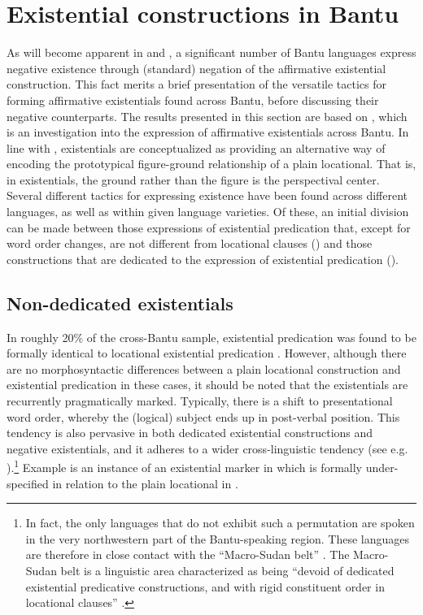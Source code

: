 \documentclass[output=paper,draft,draftmode,colorlinks,citecolor=brown]{langscibook}
\begin{document}
\section{Existential constructions in Bantu}\label{sec:1:3} 
As will become apparent in  and
, a significant number of Bantu languages express
negative existence through (standard) negation of the affirmative
existential construction. This fact merits a brief presentation of the
versatile tactics for forming affirmative existentials found across Bantu,
before discussing their negative counterparts. The
results presented in this section are based on \citet{BernanderDevos2018},
which is an investigation into the expression of affirmative existentials across
Bantu. In line with \citet{Creissels2014,Creissels2015},
existentials are conceptualized as providing an alternative way of encoding
the prototypical figure-ground relationship of a plain locational. That is,
in existentials, the ground rather than the figure is the perspectival
center. Several different tactics for expressing existence have been found
across different languages, as well as within given language varieties. Of
these, an initial division can be made between those expressions of
existential predication that, except for word order changes, are not
different from locational clauses () and those
constructions that are dedicated to the expression of existential
predication ().

\subsection{Non-dedicated existentials}\label{sec:1:3.1}
In roughly 20\% of the cross-Bantu sample, existential predication was found to be formally identical to locational existential predication \citep{BernanderDevos2018}. However, although there are no morphosyntactic differences between a plain locational construction and existential predication in these cases, it should be noted that the existentials are recurrently pragmatically marked. Typically, there is a shift to presentational word order, whereby the (logical) subject ends up in post-verbal position. This tendency is also pervasive in both dedicated existential constructions and negative existentials, and it adheres to a wider cross-linguistic tendency (see e.g. \citealt{Freeze1992,BentleyCiconte2013}).\footnote{In fact, the only languages that do not exhibit such a permutation are spoken in the very northwestern part of the Bantu-speaking region. These languages are therefore in close contact with the ``Macro-Sudan belt'' \citep{Guldemann2008}. The Macro-Sudan belt is a linguistic area characterized as being ``devoid of dedicated existential predicative constructions, and with rigid constituent order in locational clauses'' \citep[22]{Creissels2014}.} Example  is an instance of an existential marker in  which is formally under-specified in relation to the plain locational in .
\end{document}
